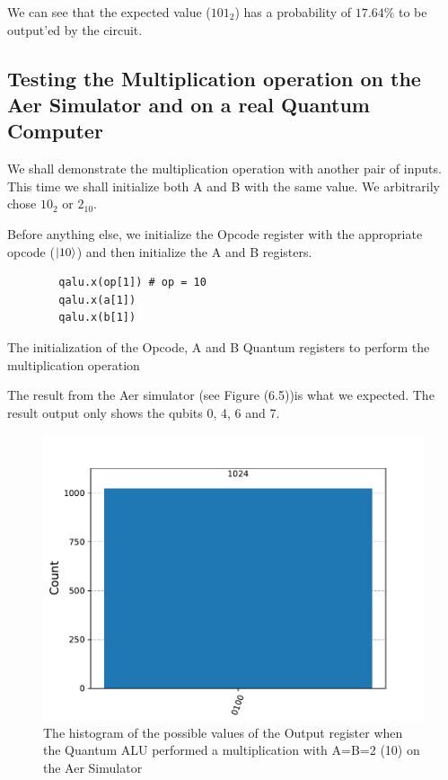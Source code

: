 We can see that the expected value ($101_2$) has a probability of $17.64\%$ to be output'ed by the circuit.

\newpage
\subsection{Testing the Multiplication operation on the Aer Simulator and on a real Quantum Computer}
We shall demonstrate the multiplication operation with another pair of inputs. This time we shall initialize both A and B with the same value. We
arbitrarily chose $10_2$ or $2_{10}$.

Before anything else, we initialize the Opcode register with the appropriate opcode ($\ket{10}$) and then initialize the A and B registers.

\begin{listing}[!ht]
    \centering
    \begin{verbatim}
        qalu.x(op[1]) # op = 10
        qalu.x(a[1])
        qalu.x(b[1])
    \end{verbatim}
    \caption{The initialization of the Opcode, A and B Quantum registers to perform the multiplication operation}
\end{listing}

The result from the Aer simulator (see Figure (6.5))is what we expected. The result output only shows the qubits 0, 4, 6 and 7.

\begin{figure}[!ht]
    \centering
    \includegraphics[scale=0.7]{images/6_Complete_System/multiplier_aer_result.pdf}
    \caption{The histogram of the possible values of the Output register when the Quantum ALU performed a multiplication with A=B=2 (10) on the Aer Simulator}
\end{figure}


